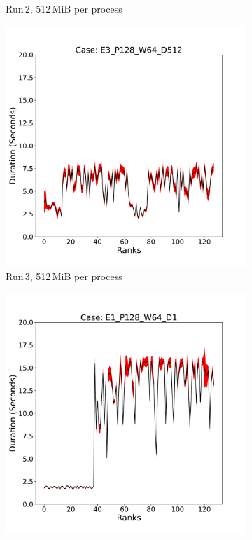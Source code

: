 \begin{figure}
\begin{subfigure}[b]{0.3\textwidth}
         \caption{Run\,2, 512\,MiB per process}
         \label{fig:E2_512_d2}
     \end{subfigure}
      \hfill
     \begin{subfigure}[b]{0.3\textwidth}
         \centering
         \includegraphics[width=\textwidth, height=\textwidth]{figures/deisa2__E3_P128_W64_D512.pdf}
         \caption{Run\,3, 512\,MiB per process}
         \label{fig:E3_512_d2}
     \end{subfigure}
     \vfill
          \begin{subfigure}[b]{0.3\textwidth}
         \centering
         \includegraphics[width=\textwidth, height=\textwidth]{figures/deisa2__E1_P128_W64_D1.pdf}

\end{subfigure}
\end{figure}

